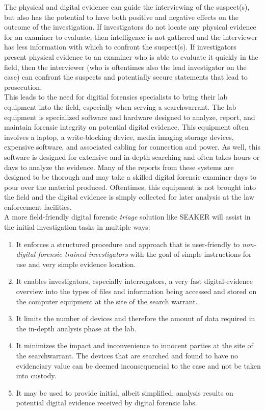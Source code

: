 \documentclass[12pt]{article}
\begin{document}
The physical and digital evidence can guide the interviewing of the suspect(s), but also
has the potential to have both positive and negative effects on the
outcome of the investigation. If investigators do not locate any physical evidence for an examiner
to evaluate, then intelligence is not gathered and the interviewer has less information with which
to confront the suspect(s). If investigators present physical evidence to an examiner who is able to
evaluate it quickly in the field, then the interviewer (who is oftentimes also the lead investigator
on the case) can confront the suspects and potentially secure statements that lead to prosecution.\\

This leads to the need for digitial forensics specialists to bring their lab equipment into the field,
especially when serving a \gls{searchwarrant}.  The lab equipment is specialized software and hardware
designed to analyze, report, and maintain forensic integrity on potential digital evidence.  This
equipment often involves a laptop, a write-blocking device, media imaging storage devices, expensive
software, and associated cabling for connection and power.  As well, this software is designed for
extensive and in-depth searching and often takes hours or days to analyze the evidence.  Many of the
reports from these systems are designed to be thorough and may take a skilled digital forensic
examiner days to pour over the material produced.  Oftentimes, this equipment is not brought
into the field and the digital evidence is simply collected for later analysis at the law
enforcement facilities.\\

A more field-friendly digital forensic {\em triage} solution like SEAKER will assist in the initial
investigation tasks in multiple ways:
\begin{enumerate}
  \item It enforces a structured procedure and approach that is user-friendly to {\em non-digital
  forensic trained investigators} with the goal of simple instructions for use and very simple 
  evidence location.
  \item It enables investigators, especially interrogators, a very fast digital-evidence overview
  into the types of files
  and information being accessed and stored on the computer equipment at the site of the search
  warrant.
  \item It limits the number of devices and therefore the amount of data required in the in-depth
  analysis phase at the lab.
  \item It minimizes the impact and inconvenience to innocent parties at the site of the 
  \gls{searchwarrant}.  The devices that are searched and found to have no evidenciary value can be
  deemed inconsequencial to the case and not be taken into custody.
  \item It may be used to provide initial, albeit simplified, analysis results on potential
  digital evidence received by digital forensic labs.
\end{enumerate}
\end{document}
